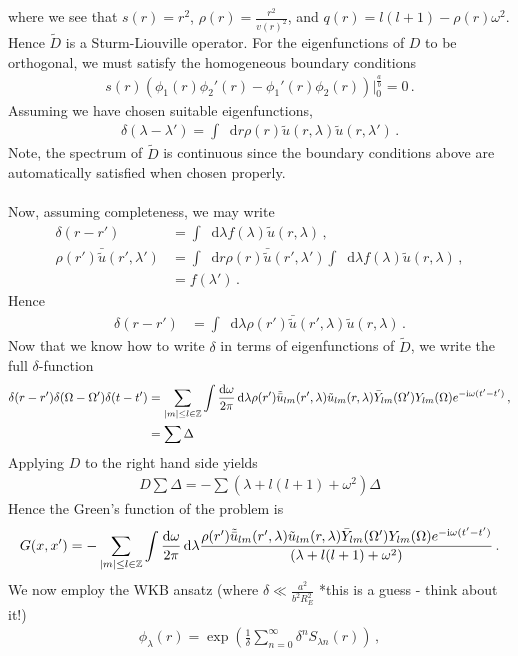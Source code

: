 \documentclass{article}
\newcommand*\diff{\mathop{}\!\mathrm{d}}
\newcommand*\Z{\mathbb Z}
\newcommand*\te[1]{\text{#1}}
\newcommand*\p[1]{\left(#1\right)}
\newcommand*\f[2]{\frac{#1}{#2}}
\newcommand*\I{\te{i}}
\begin{document}
where we see that $s(r)=r^2$, $\rho(r)=\f{r^2}{v(r)^2}$, and $q(r)=l(l+1)-\rho(r)\omega^2$. Hence $\tilde D$ is a Sturm-Liouville operator. For the eigenfunctions of $D$ to be orthogonal, we must satisfy the homogeneous boundary conditions
\begin{align}
s(r)(\phi_1(r)\phi_2'(r)-\phi_1'(r)\phi_2(r))\vert_0^{\f ab}=0\,.
\end{align}
Assuming we have chosen suitable eigenfunctions,
\begin{align}
\delta(\lambda-\lambda')=\int\diff r\rho(r)\tilde u(r,\lambda)\tilde u(r,\lambda')\,.
\end{align}
Note, the spectrum of $\tilde D$ is continuous since the boundary conditions above are automatically satisfied when chosen properly.
\\\\
Now, assuming completeness, we may write
\begin{align}
\delta(r-r')&=\int\diff \lambda f(\lambda)\tilde u(r,\lambda)\,,\\
\rho(r')\bar{\tilde u}(r',\lambda')&=\int\diff r\rho(r) \bar{\tilde u}(r',\lambda')\int\diff \lambda f(\lambda)\tilde u(r,\lambda)\,,\\
&=f(\lambda')\,.
\end{align}
Hence
\begin{align}
\delta(r-r')&=\int\diff \lambda \rho(r')\bar {\tilde u}(r',\lambda)\tilde u(r,\lambda)\,.
\end{align}
Now that we know how to write $\delta$ in terms of eigenfunctions of $\tilde D$, we write the full $\delta$-function
\begin{align}
\delta(r-r')\delta(\Omega-\Omega')\delta(t-t')&=\sum_{\abs{m}\leq l\in\Z}\int\f{\diff\omega}{2\pi}\diff \lambda \rho(r')\tilde {\bar u}_{lm}(r',\lambda)\tilde u_{lm}(r,\lambda)\bar Y_{lm}(\Omega')Y_{lm}(\Omega)e^{-\I\omega (t'-t')}\,,\\
&=\sum\Delta
\end{align}
Applying $D$ to the right hand side yields
\begin{align}
D\sum\Delta=-\sum(\lambda+l(l+1)+\omega^2)\Delta
\end{align}
Hence the Green's function of the problem is
\begin{align}
G(x,x')=-\sum_{\abs{m}\leq l\in\Z}\int\f{\diff\omega}{2\pi}\diff \lambda \f{\rho(r')\tilde {\bar u}_{lm}(r',\lambda)\tilde u_{lm}(r,\lambda)\bar Y_{lm}(\Omega')Y_{lm}(\Omega)e^{-\I\omega (t'-t')}}{(\lambda+l(l+1)+\omega^2)}\,.
\end{align}
We now employ the WKB ansatz (where $\delta\ll \f{a^2}{b^2R_E^2}$ *this is a guess - think about it!)
\begin{align}
\phi_\lambda(r)=\exp\p{\f1\delta\sum_{n=0}^{\infty}\delta^nS_{\lambda n}(r)}\,,
\end{align}
\end{document}
